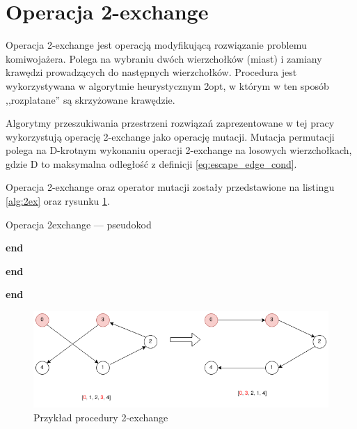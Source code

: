 \section{Operacja 2-exchange}
Operacja 2-exchange jest operacją modyfikującą rozwiązanie problemu komiwojażera. Polega na wybraniu dwóch wierzchołków (miast) i zamiany krawędzi prowadzących do następnych wierzchołków.
Procedura jest wykorzystywana w algorytmie heurystycznym 2opt, w którym w ten sposób ,,rozplatane'' są skrzyżowane krawędzie.

Algorytmy przeszukiwania przestrzeni rozwiązań zaprezentowane w tej pracy wykorzystują operację 2-exchange jako operację mutacji.
Mutacja permutacji polega na D-krotnym wykonaniu operacji 2-exchange na losowych wierzchołkach, gdzie D to maksymalna odległość
z definicji \ref{eq:escape_edge_cond}.

Operacja 2-exchange oraz operator mutacji zostały przedstawione na listingu \ref{alg:2ex} oraz rysunku \ref{fig:2exchange}.

\begin{algorithm}[h!]
      \caption{Operacja 2exchange --- pseudokod}\label{alg:2ex}


      \textbf{end}

      \vspace{0.5em}


      \textbf{end}

      \vspace{0.5em}

      \textbf{end}

\end{algorithm}

\begin{figure}[h!]
      \centering
      \includegraphics[width=\textwidth]{chapters/literature/img/2exdrawio.png}
      \caption{Przykład procedury 2-exchange}
      \label{fig:2exchange}
\end{figure}

